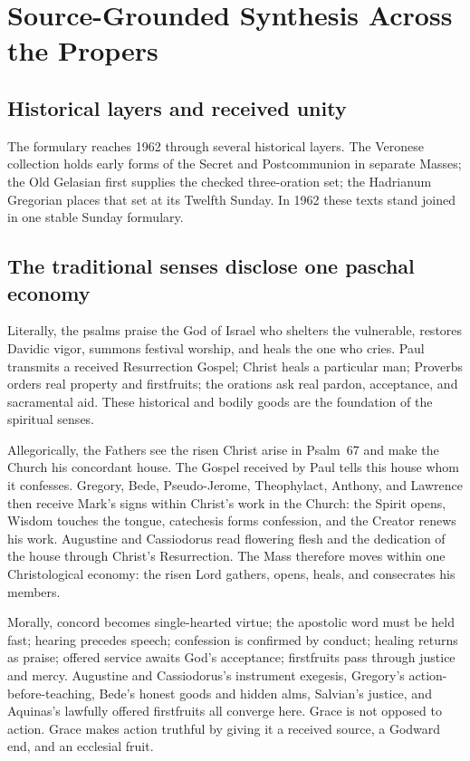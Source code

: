 \sectionguard
\section*{Source-Grounded Synthesis Across the Propers}

\ifdefined\TriptychSynthesisEdition\else
\subsection*{Historical layers and received unity}

The formulary reaches 1962 through several historical layers. The Veronese
collection holds early forms of the Secret and Postcommunion in separate
Masses; the Old Gelasian first supplies the checked three-oration set; the
Hadrianum Gregorian places that set at its Twelfth Sunday. In 1962 these
texts stand joined in one stable Sunday formulary.
\fi

\subsection*{The traditional senses disclose one paschal economy}

Literally, the psalms praise the God of Israel who shelters the vulnerable,
restores Davidic vigor, summons festival worship, and heals the one who cries.
Paul transmits a received Resurrection Gospel; Christ heals a particular man;
Proverbs orders real property and firstfruits; the orations ask real pardon,
acceptance, and sacramental aid. These historical and bodily goods are the
foundation of the spiritual senses.

Allegorically, the Fathers see the risen Christ arise in Psalm~67 and make the
Church his concordant house. The Gospel received by Paul tells this house whom
it confesses. Gregory, Bede, Pseudo-Jerome, Theophylact, Anthony, and Lawrence
then receive Mark's signs within Christ's work in the Church: the Spirit opens,
Wisdom touches the tongue, catechesis forms confession, and the Creator renews
his work. Augustine and Cassiodorus read flowering flesh and the dedication of
the house through Christ's Resurrection. The Mass therefore moves within one
Christological economy: the risen Lord gathers, opens, heals, and consecrates
his members.

Morally, concord becomes single-hearted virtue; the apostolic word must be
held fast; hearing precedes speech; confession is confirmed by conduct; healing
returns as praise; offered service awaits God's acceptance; firstfruits pass
through justice and mercy. Augustine and Cassiodorus's instrument exegesis,
Gregory's action-before-teaching, Bede's honest goods and hidden alms, Salvian's
justice, and Aquinas's lawfully offered firstfruits all converge here. Grace is
not opposed to action. Grace makes action truthful by giving it a received
source, a Godward end, and an ecclesial fruit.

